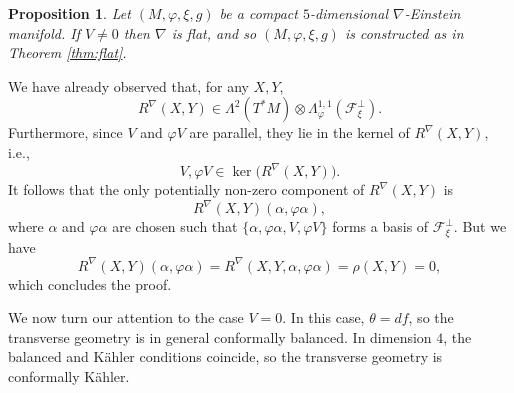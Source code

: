 \documentclass{article}
\makeatletter
\renewenvironment{proof}[1][\proofname]{%
  \par\pushQED{\qed}%
  \normalfont\topsep6\p@\@plus6\p@\relax
  \trivlist
  \item[\hskip\labelsep
        \textbf{\textup{#1}}\@addpunct{.}]\ignorespaces
}{%
  \popQED\endtrivlist\@endpefalse
}
\newtheorem{prop}[thm]{Proposition}
\theoremstyle{definition}
\renewcommand{\phi}{\varphi}
\numberwithin{equation}{section}
\makeatother
\begin{document}
\begin{prop} \label{prop:Vneq0}
Let $(M,\phi,\xi,g)$ be a compact $5$-dimensional $\nabla$-Einstein manifold. If $V \neq 0$ then $\nabla$ is flat, and so $(M,\phi,\xi,g)$ is constructed as in Theorem \ref{thm:flat}. 
\end{prop}
\begin{proof}
We have already observed that, for any $X,Y$, 
\[
R^\nabla(X,Y) \in \Lambda^2(T^*M) \otimes \Lambda^{1,1}_\phi(\mathcal{F}^\perp_\xi).
\] 
Furthermore, since $V$ and $\phi V$  are parallel, they lie in the kernel of $R^\nabla(X,Y)$, i.e.,
\[
V, \phi V \in \ker \big(R^\nabla(X,Y)\big).
\] 
It follows that the only potentially non-zero component of $R^\nabla(X,Y)$ is 
\[
R^\nabla(X,Y)(\alpha, \phi \alpha),
\] 
where $\alpha$ and $\phi \alpha$ are chosen such that $\{\alpha, \phi \alpha, V, \phi V\}$ forms a basis of $\mathcal{F}^\perp_\xi$.  
But we have
\[
R^\nabla(X,Y)(\alpha, \phi \alpha) = R^\nabla(X,Y,\alpha, \phi \alpha) = \rho(X,Y) = 0,
\]
which concludes the proof.

\end{proof}
We now turn our attention to the case $V = 0$. In this case, $\theta = df$, so the transverse geometry is in general conformally balanced. In dimension $4$, the balanced and K\"ahler conditions coincide, so the transverse geometry is  conformally K\"ahler. 
\end{document}
